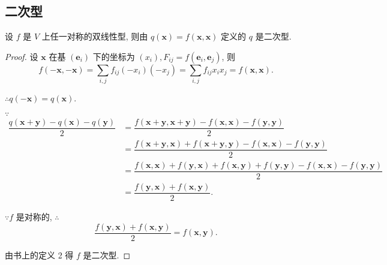 \documentclass[color=black,device=normal,lang=cn,mode=geye]{elegantnote}
\begin{document}
\subsection{二次型}
\begin{theorem}
    设 $f$ 是 $V$ 上任一对称的双线性型, 则由 $q(\boldsymbol{x})=f(\boldsymbol{x},\boldsymbol{x})$ 定义的 $q$ 是二次型.
\end{theorem}
\begin{proof}
    设 $\boldsymbol{x}$ 在基 $(\boldsymbol{e}_i)$ 下的坐标为 $(x_i),F_{ij}=f(\boldsymbol{e}_i,\boldsymbol{e}_j)$, 则
    \[f(-\boldsymbol{x},-\boldsymbol{x})=\sum\limits_{i,j}f_{ij}(-x_i)(-x_j)=\sum\limits_{i,j}f_{ij}x_ix_j=f(\boldsymbol{x},\boldsymbol{x}).\]

    $\therefore q(-\boldsymbol{x})=q(\boldsymbol{x})$.

    $\because$
    \begin{align*}
        \dfrac{q(\boldsymbol{x}+\boldsymbol{y})-q(\boldsymbol{x})-q(\boldsymbol{y})}{2} & =\dfrac{f(\boldsymbol{x}+\boldsymbol{y},\boldsymbol{x}+\boldsymbol{y})-f(\boldsymbol{x},\boldsymbol{x})-f(\boldsymbol{y},\boldsymbol{y})}{2} \\
        & =\dfrac{f(\boldsymbol{x}+\boldsymbol{y},\boldsymbol{x})+f(\boldsymbol{x}+\boldsymbol{y},\boldsymbol{y})-f(\boldsymbol{x},\boldsymbol{x})-f(\boldsymbol{y},\boldsymbol{y})}{2} \\
        & =\dfrac{f(\boldsymbol{x},\boldsymbol{x})+f(\boldsymbol{y},\boldsymbol{x})+f(\boldsymbol{x},\boldsymbol{y})+f(\boldsymbol{y},\boldsymbol{y})-f(\boldsymbol{x},\boldsymbol{x})-f(\boldsymbol{y},\boldsymbol{y})}{2} \\
        & =\dfrac{f(\boldsymbol{y},\boldsymbol{x})+f(\boldsymbol{x},\boldsymbol{y})}{2}.
    \end{align*}

    $\because f$ 是对称的, $\therefore$
    \[\dfrac{f(\boldsymbol{y},\boldsymbol{x})+f(\boldsymbol{x},\boldsymbol{y})}{2}=f(\boldsymbol{x},\boldsymbol{y}).\]

    由书上的定义 2 得 $f$ 是二次型.
\end{proof}
\end{document}
